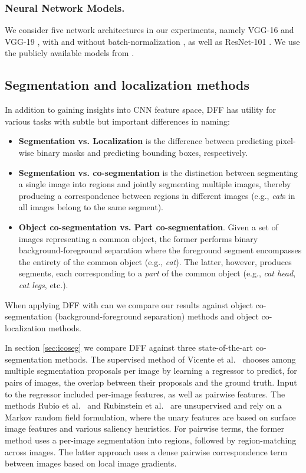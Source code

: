 \documentclass[runningheads]{llncs}
\begin{document}
	
	\subsubsection{Neural Network Models.}
	We consider five network architectures in our experiments, namely VGG-16 and VGG-19 \cite{Simonyan2014}, with and without batch-normalization \cite{Joffe2015}, as well as ResNet-101 \cite{He2016}. We use the publicly available models from \cite{Paszke2017}.

	\subsection{Segmentation and localization methods} \label{sec:baseline}
	In addition to gaining insights into CNN feature space, DFF has utility for various tasks with subtle but important differences in naming:
	\begin{itemize}
		\item \textbf{Segmentation vs. Localization} is the difference between predicting pixel-wise binary masks and predicting bounding boxes, respectively.
		\item \textbf{Segmentation vs. co-segmentation} is the distinction between segmenting a single image into regions and jointly segmenting multiple images, thereby producing a correspondence between regions in different images (e.g., \emph{cat}s in all images belong to the same segment).
		\item \textbf{Object co-segmentation vs. Part co-segmentation}. Given a set of images representing a common object, the former performs binary background-foreground separation where the foreground segment encompasses the entirety of the common object (e.g., \emph{cat}). The latter, however, produces  segments, each corresponding to a \emph{part} of the common object (e.g., \emph{cat head}, \emph{cat legs}, etc.).
	\end{itemize}
	
	When applying DFF with  can we compare our results against object co-segmentation (background-foreground separation) methods and object co-localization methods.
	
	In section \ref{sec:icoseg} we compare DFF against three state-of-the-art co-segmentation methods.	 
	The supervised method of Vicente et al.~\cite{vicente2011object} chooses among multiple segmentation proposals per image by learning a regressor to predict, for pairs of images, the overlap between their proposals and the ground truth. Input to the regressor included per-image features, as well as pairwise features.	 
	The methods Rubio et al.~\cite{rubio2012unsupervised} and Rubinstein et al.~\cite{Rubinstein13Unsupervised} are unsupervised and rely on a Markov random field formulation, where the unary features are based on surface image features and various saliency heuristics. For pairwise terms, the former method uses a per-image segmentation into regions, followed by region-matching across images.  The latter approach uses a dense pairwise correspondence term between images based on local image gradients.
	
\end{document}
